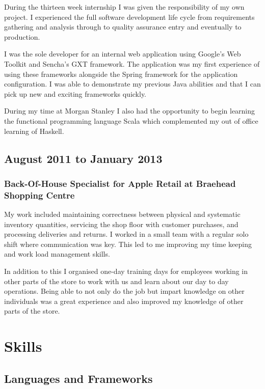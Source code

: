 \documentclass[11pt,a4paper]{article}
\begin{document}
During the thirteen week internship I was given the responsibility of my own
project. I experienced the full software development life cycle from
requirements gathering and analysis through to quality assurance entry and
eventually to production.

I was the sole developer for an internal web application using Google's Web
Toolkit and Sencha's GXT framework. The application was my first experience of
using these frameworks alongside the Spring framework for the application
configuration. I was able to demonstrate my previous Java abilities and that I
can pick up new and exciting frameworks quickly.

During my time at Morgan Stanley I also had the opportunity to begin learning
the functional programming language Scala which complemented my out of office
learning of Haskell.

\subsection*{August 2011 to January 2013}

\subsubsection*{Back-Of-House Specialist for Apple Retail at Braehead Shopping Centre}

My work included maintaining correctness between physical and systematic
inventory quantities, servicing the shop floor with customer purchases, and
processing deliveries and returns. I worked in a small team with a regular solo
shift where communication was key. This led to me improving my time keeping and
work load management skills.

In addition to this I organised one-day training days for employees working in
other parts of the store to work with us and learn about our day to day
operations. Being able to not only do the job but impart knowledge on other
individuals was a great experience and also improved my knowledge of other parts
of the store.

\section*{Skills}

\subsection*{Languages and Frameworks}
\end{document}
